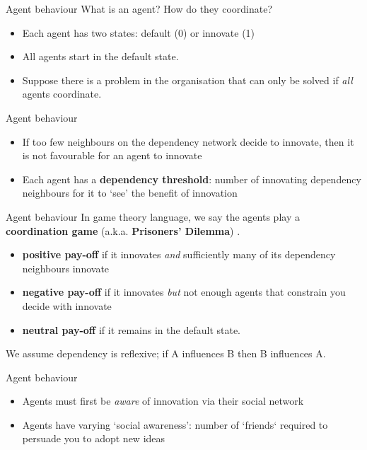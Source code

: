 \documentclass[10pt, xcolor=dvipsnames]{beamer}
\begin{document}
\begin{frame}{Agent behaviour}
What is an agent? How do they coordinate? \cite{granell_dynamical_2013}
\begin{itemize}
\pause \item Each agent has two states: default (0) or innovate (1)
\pause \item All agents start in the default state.
\pause \item Suppose there is a problem in the organisation that can only be solved if \emph{all} agents coordinate.
\end{itemize}
\end{frame}



\begin{frame}{Agent behaviour}
\begin{itemize}
\pause \item If too few neighbours on the dependency network decide to innovate, then it is not favourable for an agent to innovate
\pause \item Each agent has a \textbf{dependency threshold}: number of innovating dependency neighbours for it to `see' the benefit of innovation
\end{itemize}
\end{frame}

\begin{frame}{Agent behaviour}
In game theory language, we say the agents play a \textbf{coordination game} (a.k.a. \textbf{Prisoners' Dilemma}) \cite{shoham_multiagent_2008} \cite{jackson_games_2014}.
\begin{itemize}
\pause \item \textbf{positive pay-off} if it innovates \emph{and} sufficiently many of its dependency neighbours innovate
\pause \item \textbf{negative pay-off} if it innovates \emph{but} not enough agents that constrain you decide with innovate
\pause \item \textbf{neutral pay-off} if it remains in the default state.
\end{itemize}
We assume dependency is reflexive; if A influences B then B influences A.
\end{frame}

\begin{frame}{Agent behaviour}
\begin{itemize}
\pause \item Agents must first be \emph{aware} of innovation via their social network
\pause \item Agents have varying `social awareness': number of `friends` required to persuade you to adopt new ideas
\end{itemize}
\end{frame}
\end{document}
